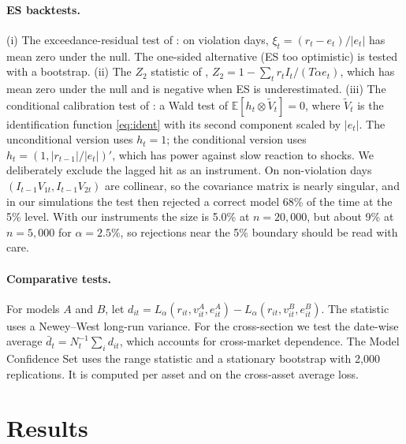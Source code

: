 \documentclass[11pt]{article}
\theoremstyle{remark}
\newcommand{\1}{\mathbf{1}}
\newcommand{\E}{\mathbb{E}}
\begin{document}
\paragraph{ES backtests.} (i) The exceedance-residual test of \citet{mcneil2000estimation}: on violation days, $\xi_t=(r_t-e_t)/|e_t|$ has mean zero under the null. The one-sided alternative (ES too optimistic) is tested with a bootstrap. (ii) The $Z_2$ statistic of \citet{acerbi2014backtesting}, $Z_2=1-\sum_tr_tI_t/(T\alpha e_t)$, which has mean zero under the null and is negative when ES is underestimated. (iii) The conditional calibration test of \citet{nolde2017elicitability}: a Wald test of $\E[h_t\otimes\tilde V_t]=0$, where $\tilde V_t$ is the identification function \eqref{eq:ident} with its second component scaled by $|e_t|$. The unconditional version uses $h_t=1$; the conditional version uses $h_t=(1,|r_{t-1}|/|e_t|)'$, which has power against slow reaction to shocks. We deliberately exclude the lagged hit as an instrument. On non-violation days $(I_{t-1}V_{1t},I_{t-1}V_{2t})$ are collinear, so the covariance matrix is nearly singular, and in our simulations the test then rejected a correct model 68\% of the time at the 5\% level. With our instruments the size is 5.0\% at $n=20{,}000$, but about 9\% at $n=5{,}000$ for $\alpha=2.5\%$, so rejections near the 5\% boundary should be read with care.

\paragraph{Comparative tests.} For models $A$ and $B$, let $d_{it}=L_\alpha(r_{it},v^A_{it},e^A_{it})-L_\alpha(r_{it},v^B_{it},e^B_{it})$. The \citet{diebold1995comparing} statistic uses a Newey--West long-run variance. For the cross-section we test the date-wise average $\bar d_t=N_t^{-1}\sum_id_{it}$, which accounts for cross-market dependence. The Model Confidence Set \citep{hansen2011model} uses the range statistic and a stationary bootstrap \citep{politis1994stationary} with 2{,}000 replications. It is computed per asset and on the cross-asset average loss.

\section{Results}\label{sec:results}

\end{document}
